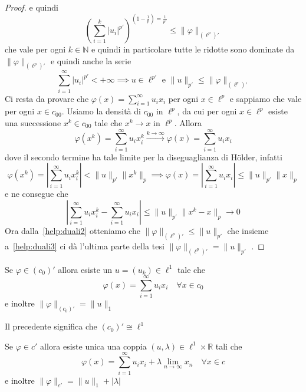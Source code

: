 \begin{proof}
    
   e quindi 
   \[\left( \sum_{i = 1}^{k} |u_i|^{p'} \right)^{\left( 1-\frac{1}{p} \right)=
   \frac{1}{p'}} \le \| \varphi\|_{(\ell^p)'}\]
    che vale per ogni \(k \in \mathbb{N}\) e quindi in particolare tutte le
    ridotte sono dominate da \(\|\varphi \|_{{(\ell^{p})}'} \) e quindi anche la
    serie 
    \begin{equation}\label{help:duali3}
        \sum_{i=1}^{\infty} |u_{i}|^{p'} < +\infty \implies u \in \ell^{p'}
        \text{ e } \|u\|_{p'} \le \|\varphi \|_{{(\ell^{p})}'}
    \end{equation}
    Ci resta da provare che \(\varphi {(x)} = \sum_{i=1}^{\infty} u_{i} x_{i} \)
    per ogni \(x \in \ell^{p}\) e sappiamo che vale per ogni \(x \in c_{00} \).
    Usiamo la densità di \(c_{00} \) in \(\ell^{p}\), da cui per ogni \(x \in
    \ell^{p}\) esiste una successione \(x^{k} \in  c_{00} \) tale che \(x^{k}
    \to x\) in \(\ell^{p}\). Allora 
    \[
        \varphi {(x^{k})} = \sum_{i=1}^{\infty} u_{i} x_{i}^{k}
        \overset{k \to \infty}{\longrightarrow} \varphi {(x)} =
        \sum_{i=1}^{\infty} u_{i} x_{i}
    \]
    dove il secondo termine ha tale limite per la diseguaglianza di Hölder,
    infatti 
    \begin{equation}\label{help:duali2}
      \varphi {(x^{k})} = \left| \sum_{i=1}^{\infty} u_{i} x_{i}^{k}  \right| < \|u\|_{p'}
      \|x^{k}\|_p \implies \varphi {(x)} = \left| \sum_{i=1}^{\infty} u_{i} x_{i}  \right| \le
      \|u\|_{p'} \|x\|_p
    \end{equation}
    e ne consegue che
    \[
      \left| \sum_{i=1}^{\infty} u_{i}x_{i}^{k} - \sum_{i=1}^{\infty} u_{i}x_{i}
      \right| \le \|u\|_{p'} \|x^{k} - x\|_p \to 0
    \]
    Ora dalla~\eqref{help:duali2} otteniamo che \(\|\varphi \|_{{(\ell^{p})}'}
    \le \|u\|_{p'} \)  che insieme a~\eqref{help:duali3} ci dà l'ultima parte
    della tesi \(\|\varphi \|_{{(\ell^{p})}'} = \|u\|_{p'}\) .
\end{proof}
\begin{theorem}
    Se \(\varphi \in {(c_{0})}'\) allora esiste un \(u = {(u_k)} \in \ell^{1}\)
    tale che 
    \[
        \varphi {(x)} = \sum_{i=1}^{\infty} u_{i} x_{i} \quad \forall x \in c_{0} 
    \]
    e inoltre \(\|\varphi \|_{{(c_{0})}'} = \|u\|_1\)
\end{theorem}
\begin{remark}
Il precedente significa che \({(c_{0})}' \cong \ell^{1}\) 
\end{remark}
\begin{theorem}
    Se \(\varphi \in c'\) allora esiste unica una coppia \({(u, \lambda)} \in
    \ell^{1} \times \mathbb{R}\) tali che
    \[
      \varphi {(x)} = \sum_{i=1}^{\infty} u_{i}x_{i} + \lambda \lim_{n \to
      \infty} x_{n} \quad \forall x \in c 
    \]
    e inoltre \(\|\varphi \|_{c'} = \|u\|_1 + |\lambda|\) 
\end{theorem}


